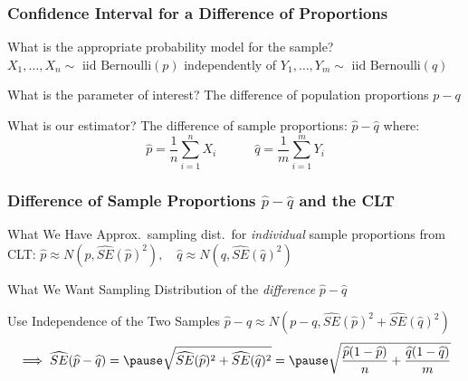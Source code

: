 \documentclass{beamer}
\begin{document}
\begin{frame}
\frametitle{Confidence Interval for a Difference of Proportions}
	\begin{block}{What is the appropriate probability model for the sample?} 
$X_1, \hdots, X_n \sim \mbox{ iid Bernoulli}(p)$ independently  of $Y_1, \hdots, Y_m \sim \mbox{ iid Bernoulli}(q)$
\end{block}
	\begin{block}{What is the parameter of interest?}
The difference of population proportions $p - q$
\end{block}

\begin{block}{What is our estimator?}
The difference of sample proportions: $\widehat{p} - \widehat{q}$ where:
	$$\widehat{p} = \frac{1}{n}\sum_{i=1}^n X_i \quad \quad \quad	\widehat{q} = \frac{1}{m}\sum_{i=1}^m Y_i$$
\end{block}
\end{frame}

\begin{frame}
\frametitle{Difference of Sample Proportions $\widehat{p}-\widehat{q}$ and the CLT}
\begin{block}{What We Have}
Approx.\ sampling dist.\ for \emph{individual} sample proportions from CLT:
\alert{$\widehat{p} \approx N\left(p, \widehat{SE}(\widehat{p})^2\right), \quad \widehat{q} \approx N\left(q, \widehat{SE}(\widehat{q})^2\right)$}
\end{block}\pause

\begin{block}{What We Want}
Sampling Distribution of the \emph{difference} $\widehat{p} - \widehat{q}$
\end{block}\pause

\begin{block}{Use Independence of the Two Samples}
\alert{$\widehat{p} - \widehat{q} \approx N\left( p - q, \widehat{SE}(\widehat{p})^2 +\widehat{SE}(\widehat{q})^2\right)$} \pause
$$\implies \widehat{SE}(\widehat{p} - \widehat{q}) = \pause \sqrt{\widehat{SE}(\widehat{p})^2 +\widehat{SE}(\widehat{q})^2}  = \pause  \sqrt{\frac{\widehat{p}(1-\widehat{p})}{n} + \frac{\widehat{q}(1-\widehat{q})}{m}}$$
\end{block}

\end{frame}
\end{document}

